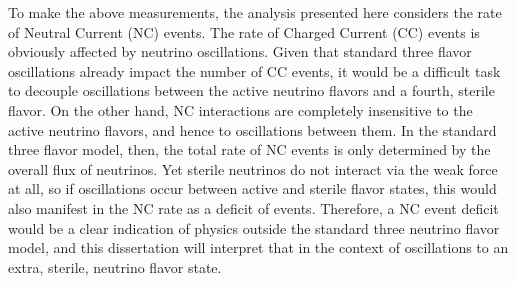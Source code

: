 To make the above measurements, the analysis presented here considers the rate of Neutral Current (NC) events. The rate of Charged Current (CC) events is obviously affected by neutrino oscillations. Given that standard three flavor oscillations already impact the number of CC events, it would be a difficult task to decouple oscillations between the active neutrino flavors and a fourth, sterile flavor. On the other hand, NC interactions are completely insensitive to the active neutrino flavors, and hence to oscillations between them. In the standard three flavor model, then, the total rate of NC events is only determined by the overall flux of neutrinos. Yet sterile neutrinos do not interact via the weak force at all, so if oscillations occur between active and sterile flavor states, this would also manifest in the NC rate as a deficit of events. Therefore, a NC event deficit would be a clear indication of physics outside the standard three neutrino flavor model, and this dissertation will interpret that in the context of oscillations to an extra, sterile, neutrino flavor state.